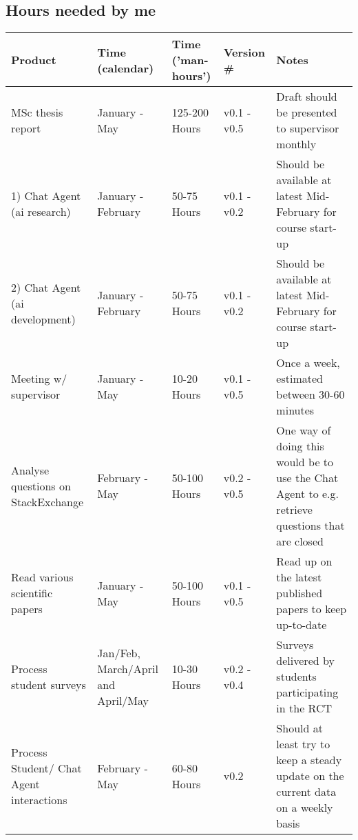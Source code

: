 \subsection{Hours needed by me}
\label{chapter5:hours_needed_by_me}
\begin{center}
	\begin{tabular}{| p{4cm} | p{2.5cm} | l |  l | p{4cm} |}
		\hline
		Product & Time (calendar) & Time ('man-hours')\footnotemark & Version \# & Notes  \\
		\hline
		MSc thesis report & January - May & 125-200 Hours & v0.1 - v0.5 & Draft should be presented to supervisor monthly \\ 
		\hline
		1) Chat Agent \newline (\gls{ai} research) & January - \newline February & 50-75 Hours & v0.1 - v0.2 &  Should be available at \newline latest Mid-February for 
		\newline course start-up \\ 
		\hline
		2) Chat Agent \newline (\gls{ai} development) & January -\newline  February & 50-75 Hours & v0.1 - v0.2 & Should be available at \newline latest Mid-February for 
		\newline course start-up \\ 
		\hline
		Meeting w/ supervisor & January - May & 10-20 Hours & v0.1 - v0.5 & Once a week, estimated between 30-60 minutes \\ 
		\hline
		Analyse questions \newline on StackExchange & February - May & 50-100 Hours & v0.2 - v0.5 & One way of doing this \newline would be to use the 
		\newline Chat Agent to e.g. \newline retrieve questions \newline that are closed \\ 
		\hline
		Read various scientific \newline papers & January - May & 50-100 Hours & v0.1 - v0.5 & Read up on the latest \newline published papers to keep up-to-date \\ 
		\hline
		Process student surveys & Jan/Feb, March/April and April/May & 10-30 Hours & v0.2 - v0.4 & Surveys delivered by \newline students participating in \newline the RCT \\ 
		\hline
		Process Student/ \newline Chat Agent interactions & February - May & 60-80 Hours & v0.2 & Should at least try to 
		\newline keep a steady update on \newline the current data on \newline a weekly basis \\ 
		\hline
	\end{tabular}
\end{center}
	
